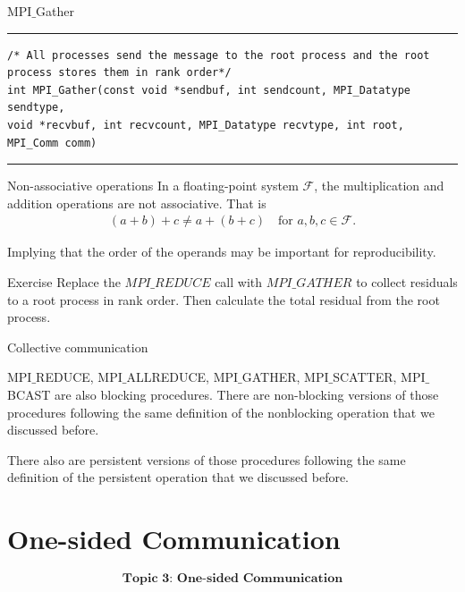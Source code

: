 \documentclass[xcolor=dvipsnames]{beamer}
\begin{document}
\begin{frame}[fragile]{MPI$\_$Gather}
\rule{\textwidth}{1pt}
\scriptsize
\begin{verbatim}
/* All processes send the message to the root process and the root 
process stores them in rank order*/
int MPI_Gather(const void *sendbuf, int sendcount, MPI_Datatype sendtype,
void *recvbuf, int recvcount, MPI_Datatype recvtype, int root,
MPI_Comm comm)
\end{verbatim}
\rule{\textwidth}{1pt}
\end{frame}

\begin{frame}{Non-associative operations}
In a floating-point system $\mathcal{F}$, the multiplication and addition operations are not associative. That is
\begin{align*}
    (a+b)+c \ne a+(b+c)\quad \text{for } a,b, c\in \mathcal{F}.
\end{align*}

Implying that the order of the operands may be important for reproducibility.
\end{frame}

\begin{frame}{Exercise}
Replace the $MPI\_REDUCE$ call with $MPI\_GATHER$ to collect residuals to a root process in rank order. Then calculate the total residual from the root process.
\end{frame}

\begin{frame}{Collective communication}
\begin{outline}
\1 MPI$\_$REDUCE, MPI$\_$ALLREDUCE, MPI$\_$GATHER, MPI$\_$SCATTER, MPI$\_$BCAST are also blocking procedures.
\1 There are non-blocking versions of those procedures following the same definition of the nonblocking operation that we discussed before.

\1 There also are persistent versions of those procedures following the same definition of the persistent operation that we discussed before.
\end{outline}
\end{frame}



\section{One-sided Communication}
\begin{frame}{}
$$\textbf{Topic 3: One-sided Communication}$$
\end{frame}
\end{document}
